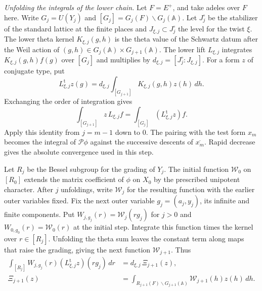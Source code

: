 \emph{Unfolding the integrals of the lower chain.}
Let \(F=E^+\), and take adeles over \(F\) here.
Write \(G_j=U(Y_j)\) and \([G_j]=G_j(F)\backslash G_j(\mathbb A)\). Let \(J^\circ_j\) be the stabilizer of the standard
lattice at the finite places and \(J_{\xi,j}\subset J^\circ_j\) the
level for the twist \(\xi\).
The lower theta kernel \(K_{\xi,j}(g,h)\) is the theta value of the
Schwartz datum after the Weil action of
\((g,h)\in G_j(\mathbb A)\times G_{j+1}(\mathbb A)\).
The lower lift \(L_{\xi,j}\) integrates \(K_{\xi,j}(g,h)f(g)\)
over \([G_j]\) and multiplies by \(d_{\xi,j}=[J^\circ_j:J_{\xi,j}]\).
For a form \(z\) of conjugate type, put
\[
 L_{\xi,j}^{\mathrm t}z(g)=d_{\xi,j}
          \int_{[G_{j+1}]}K_{\xi,j}(g,h)z(h)\,dh .
\]
Exchanging the order of integration gives
\[
  \int_{[G_{j+1}]} z\,L_{\xi,j} f
      = \int_{[G_j]}(L_{\xi,j}^{\mathrm t}z)f .
\]
Apply this identity from \(j=m-1\) down to \(0\).
The pairing with the test form \(x_m\) becomes the integral of
\(\mathcal P\phi\) against the successive descents of \(\overline{x_m}\).
Rapid decrease gives the absolute convergence used in this step.

Let \(R_j\) be the Bessel subgroup for the grading of \(Y_j\).
The initial function \(\mathcal W_0\) on \([R_0]\) extends the
matrix coefficient of \(\phi\) on \(X_0\) by the prescribed
unipotent character. After \(j\) unfoldings, write \(\mathcal W_j\)
for the resulting function with the earlier outer variables fixed.
Fix the next outer variable \(g_j=(a_j,y_j)\), its infinite and
finite components. Put \(W_{j,g_j}(r)=\mathcal W_j(rg_j)\) for \(j>0\)
and \(W_{0,g_0}(r)=\mathcal W_0(r)\) at the initial step.
Integrate this function times the kernel over \(r\in[R_j]\).
Unfolding the theta sum leaves the constant term along maps that
raise the grading, giving the next function \(\mathcal W_{j+1}\).
Thus
\[
 \begin{aligned}
 \int_{[R_j]}W_{j,g_j}(r)(L_{\xi,j}^{\mathrm t}z)(rg_j)\,dr
   &=d_{\xi,j}\,\Xi_{j+1}(z),\\
 \Xi_{j+1}(z)
   &=\int_{R_{j+1}(F)\backslash G_{j+1}(\mathbb A)}
                   \mathcal W_{j+1}(h)z(h)\,dh .
 \end{aligned}
\]

